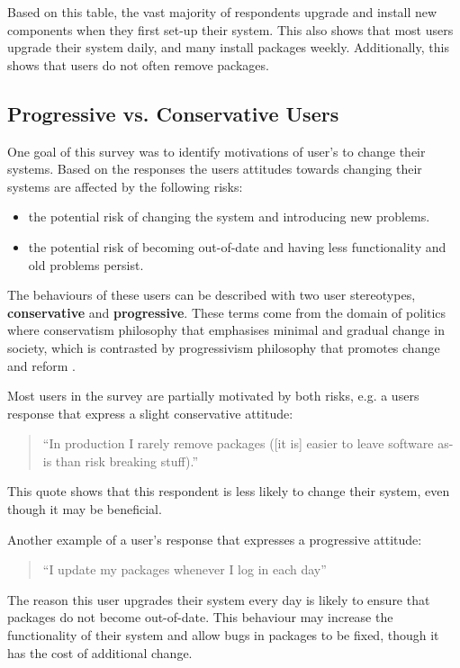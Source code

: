 Based on this table, the vast majority of respondents upgrade and install new components when they first set-up their system.
This also shows that most users upgrade their system daily, and many install packages weekly.
Additionally, this shows that users do not often remove packages. 

\subsection{Progressive vs. Conservative Users}
One goal of this survey was to identify motivations of user's to change their systems.
Based on the responses the users attitudes towards changing their systems are affected by the following risks:
\begin{itemize}
  \item the potential risk of changing the system and introducing new problems.
  \item the potential risk of becoming out-of-date and having less functionality and old problems persist.
\end{itemize}
The behaviours of these users can be described with two user stereotypes, \textbf{conservative} and \textbf{progressive}.
These terms come from the domain of politics where conservatism philosophy that emphasises minimal and gradual change in society,
which is contrasted by progressivism philosophy that promotes change and reform \citep{oed2010}.

Most users in the survey are partially motivated by both risks, e.g. a users response that express a slight conservative attitude:
\begin{quotation}
``In production I rarely remove packages ([it is] easier to leave software as-is than risk breaking stuff).''
\end{quotation}
This quote shows that this respondent is less likely to change their system, even though it may be beneficial. 

Another example of a user's response that expresses a progressive attitude:
\begin{quotation}
``I update my packages whenever I log in each day''
\end{quotation}
The reason this user upgrades their system every day is likely to ensure that packages do not become out-of-date.
This behaviour may increase the functionality of their system and allow bugs in packages to be fixed, though it has the cost of additional change.

